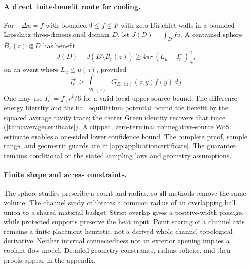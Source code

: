 \paragraph{A direct finite-benefit route for cooling.}
For $-\Delta u=f$ with bounded $0\le f\le F$ with zero Dirichlet walls in a bounded Lipschitz
three-dimensional domain $D$, let $J(D)=\int_Dfu$. A contained sphere
$\overline B_r(z)\Subset D$ has benefit
\begin{equation}
 J(D)-J(D\setminus\overline B_r(z))
 \ge 4\pi r\,(L_u-I_r^+)_+^2,
 \label{eg:eq:finitebenefit}
\end{equation}
on an event where $L_u\le u(z)$, provided
\[
I_r^+\ge\int_{B_r(z)}G_{B_r(z)}(z,y)f(y)\,dy.
\]
One may use $I_r^+=f_+r^2/6$ for a valid local upper source bound.
The difference-energy identity and the ball equilibrium potential bound the
benefit by the squared average cavity trace; the center Green identity
recovers that trace (\cref{thm:averagecertificate}). A clipped,
zero-terminal nonnegative-source WoS estimate enables a one-sided lower
confidence bound. The complete proof, sample range, and geometric guards are
in \cref{app:applicationcertificate}. The guarantee remains conditional on
the stated sampling laws and geometry assumptions.

\paragraph{Finite shape and access constraints.}
The sphere studies prescribe a count and radius, so all methods remove the
same volume. The channel study calibrates a common radius of an overlapping
ball union to a shared material budget. Strict overlap gives a positive-width
passage, while protected supports preserve the heat input. Point scoring of
a channel axis remains a finite-placement heuristic, not a derived
whole-channel topological derivative. Neither internal connectedness nor an
exterior opening implies a coolant-flow model. Detailed geometry constraints,
radius policies, and their proofs appear in the appendix.
